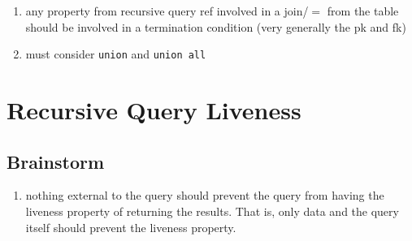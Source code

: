 \documentclass[12pt]{article}
\begin{document}
\begin{enumerate}
  \item any property from recursive query ref involved in a join/$=$ from the table should be involved in a termination condition (very generally the pk and fk)
  \item must consider \verb|union| and \verb|union all|
 \end{enumerate}

\newpage
\section{Recursive Query Liveness}

\subsection{Brainstorm}
\begin{enumerate}
  \item nothing external to the query should prevent the query from having the liveness property of returning the results. That is, only data and the query itself should prevent the liveness property.
\end{enumerate}
\end{document}
